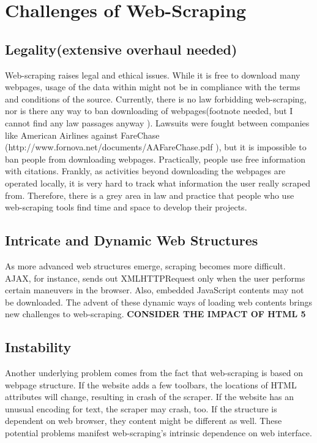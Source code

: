 \documentclass[12pt]{report}
\begin{document}
\section{Challenges of Web-Scraping}

\subsection{Legality(extensive overhaul needed)}

Web-scraping raises legal and ethical issues. While it is free to download many webpages, usage of the data within might not be in compliance with the terms and conditions of the source. Currently, there is no law forbidding web-scraping, nor is there any way to ban downloading of webpages(footnote needed, but I cannot find any law passages anyway ). Lawsuits were fought between companies like American Airlines against FareChase (http://www.fornova.net/documents/AAFareChase.pdf ), but it is impossible to ban people from downloading webpages. Practically, people use free information with citations. Frankly, as activities beyond downloading the webpages are operated locally, it is very hard to track what information the user really scraped from. Therefore, there is a grey area in law and practice that people who use web-scraping tools find time and space to develop their projects.

\subsection{Intricate and Dynamic Web Structures}

As more advanced web structures emerge, scraping becomes more difficult. AJAX, for instance, sends out XMLHTTPRequest only when the user performs certain maneuvers in the browser. Also, embedded JavaScript contents may not be downloaded. The advent of these dynamic ways of loading web contents brings new challenges to web-scraping. \textbf{CONSIDER THE IMPACT OF HTML 5}


\subsection{Instability}
Another underlying problem comes from the fact that web-scraping is based on webpage structure. If the website adds a few toolbars, the locations of HTML attributes will change, resulting in crash of the scraper. If the website has an unusual encoding for text, the scraper may crash, too. If the structure is dependent on web browser, they content might be different as well. These potential problems manifest web-scraping's intrinsic dependence on web interface.
\end{document}
